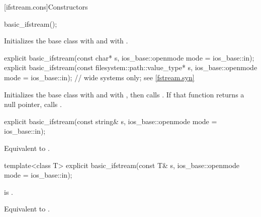 [ifstream.cons]{Constructors}

%
\begin{itemdecl}
basic_ifstream();
\end{itemdecl}

\begin{itemdescr}
\pnum
\effects
Initializes the base class with
and  with
.
\end{itemdescr}

%
\begin{itemdecl}
explicit basic_ifstream(const char* s,
                        ios_base::openmode mode = ios_base::in);
explicit basic_ifstream(const filesystem::path::value_type* s,
                        ios_base::openmode mode = ios_base::in);  // wide systems only; see \ref{fstream.syn}
\end{itemdecl}

\begin{itemdescr}
\pnum
\effects
Initializes the base class with
and  with
,
then calls
.
If that function returns a null pointer, calls
.
\end{itemdescr}

%
\begin{itemdecl}
explicit basic_ifstream(const string& s,
                        ios_base::openmode mode = ios_base::in);
\end{itemdecl}

\begin{itemdescr}
\pnum
\effects
Equivalent to .
\end{itemdescr}

%
\begin{itemdecl}
template<class T>
  explicit basic_ifstream(const T& s, ios_base::openmode mode = ios_base::in);
\end{itemdecl}

\begin{itemdescr}
\pnum
\constraints
{} is .

\pnum
\effects
Equivalent to .
\end{itemdescr}

